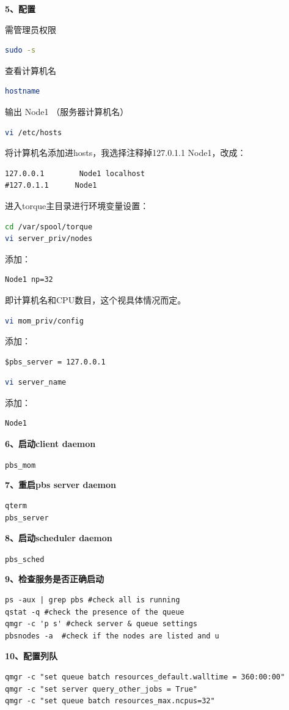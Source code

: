 {\textbf{5、配置}

需管理员权限
\begin{lstlisting}[language=sh]
sudo -s
\end{lstlisting}
查看计算机名
\begin{lstlisting}[language=sh]
hostname
\end{lstlisting}
输出 Node1 （服务器计算机名）
\begin{lstlisting}[language=sh]
vi /etc/hosts
\end{lstlisting}
 将计算机名添加进hosts，我选择注释掉127.0.1.1 Node1，改成：
 \begin{verbatim}
127.0.0.1        Node1 localhost
#127.0.1.1      Node1
\end{verbatim}
进入torque主目录进行环境变量设置：
\begin{lstlisting}[language=sh]
cd /var/spool/torque
vi server_priv/nodes
\end{lstlisting}
添加：
 \begin{verbatim}
Node1 np=32
\end{verbatim}
即计算机名和CPU数目，这个视具体情况而定。
\begin{lstlisting}[language=sh]
vi mom_priv/config
\end{lstlisting}
添加：
\begin{verbatim}
$pbs_server = 127.0.0.1
\end{verbatim}
\begin{lstlisting}[language=sh]
vi server_name
\end{lstlisting}
添加：
\begin{verbatim}
Node1
\end{verbatim}


\textbf{6、启动client daemon}

\verb|pbs_mom|

\textbf{7、重启pbs server daemon}
\begin{verbatim}
qterm
pbs_server
\end{verbatim}

\textbf{8、启动scheduler daemon}

\verb|pbs_sched|

\textbf{9、检查服务是否正确启动}
\begin{verbatim}
ps -aux | grep pbs #check all is running
qstat -q #check the presence of the queue
qmgr -c 'p s' #check server & queue settings
pbsnodes -a  #check if the nodes are listed and u
\end{verbatim}

\textbf{10、配置列队}
\begin{verbatim}
qmgr -c "set queue batch resources_default.walltime = 360:00:00"
qmgr -c "set server query_other_jobs = True"
qmgr -c "set queue batch resources_max.ncpus=32"
\end{verbatim}

}
